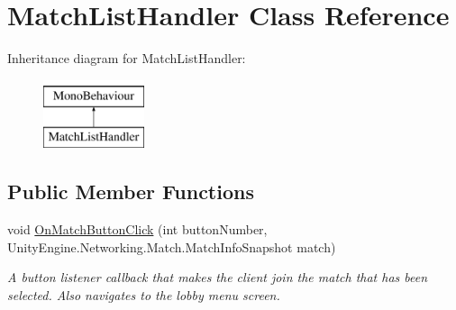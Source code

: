 \hypertarget{class_match_list_handler}{}\section{Match\+List\+Handler Class Reference}
\label{class_match_list_handler}
Inheritance diagram for Match\+List\+Handler\+:\begin{figure}[H]
\begin{center}
\leavevmode
\includegraphics[height=2.000000cm]{class_match_list_handler}
\end{center}
\end{figure}
\subsection*{Public Member Functions}
\begin{DoxyCompactItemize}
\item 
void \hyperlink{class_match_list_handler_a19cbf24b2e0caf778f85f7df1c2d8cf3}{On\+Match\+Button\+Click} (int button\+Number, Unity\+Engine.\+Networking.\+Match.\+Match\+Info\+Snapshot match)
\begin{DoxyCompactList}\small\item\em A button listener callback that makes the client join the match that has been selected. Also navigates to the lobby menu screen. \end{DoxyCompactList}\end{DoxyCompactItemize}
